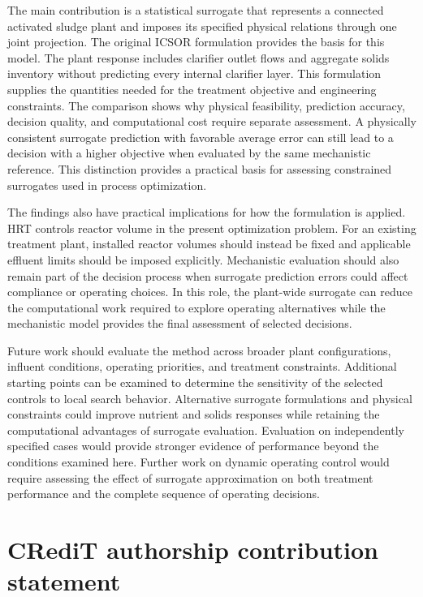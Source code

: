 \documentclass[a4paper,fleqn]{cas-sc}
\begin{document}
The main contribution is a statistical surrogate that represents a connected activated sludge plant and imposes its specified physical relations through one joint projection. The original ICSOR formulation provides the basis for this model. The plant response includes clarifier outlet flows and aggregate solids inventory without predicting every internal clarifier layer. This formulation supplies the quantities needed for the treatment objective and engineering constraints. The comparison shows why physical feasibility, prediction accuracy, decision quality, and computational cost require separate assessment. A physically consistent surrogate prediction with favorable average error can still lead to a decision with a higher objective when evaluated by the same mechanistic reference. This distinction provides a practical basis for assessing constrained surrogates used in process optimization.

The findings also have practical implications for how the formulation is applied. HRT controls reactor volume in the present optimization problem. For an existing treatment plant, installed reactor volumes should instead be fixed and applicable effluent limits should be imposed explicitly. Mechanistic evaluation should also remain part of the decision process when surrogate prediction errors could affect compliance or operating choices. In this role, the plant-wide surrogate can reduce the computational work required to explore operating alternatives while the mechanistic model provides the final assessment of selected decisions.

Future work should evaluate the method across broader plant configurations, influent conditions, operating priorities, and treatment constraints. Additional starting points can be examined to determine the sensitivity of the selected controls to local search behavior. Alternative surrogate formulations and physical constraints could improve nutrient and solids responses while retaining the computational advantages of surrogate evaluation. Evaluation on independently specified cases would provide stronger evidence of performance beyond the conditions examined here. Further work on dynamic operating control would require assessing the effect of surrogate approximation on both treatment performance and the complete sequence of operating decisions.

\section*{CRediT authorship contribution statement}
\end{document}
